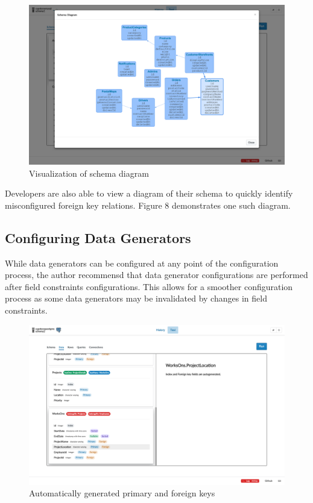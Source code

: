 \documentclass[12pt]{report}
\begin{document}
\begin{spacing}{1.9}
		
		\begin{figure}[H]
			\centering
			\includegraphics[width=\textwidth]{3-2-1d.png}
			\caption{Visualization of schema diagram}
			
		\end{figure}
		
		Developers are also able to view a diagram of their schema to quickly identify misconfigured foreign key relations. Figure 8 demonstrates one such diagram.
		
		\subsection{Configuring Data Generators}
		
		While data generators can be configured at any point of the configuration process, the author recommensd that data generator configurations are performed after field constraints configurations. This allows for a smoother configuration process as some data generators may be invalidated by changes in field constraints.
		
		
		\begin{figure}[H]
			\centering
			\includegraphics[width=\textwidth]{3-2-2.png}
			\caption{Automatically generated primary and foreign keys}
			

\end{figure}
\end{spacing}
\end{document}
